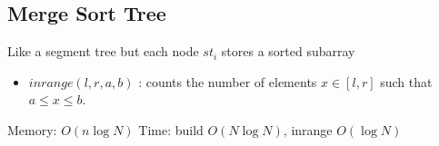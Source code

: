 \subsection{Merge Sort Tree}

Like a segment tree but each node $st_i$ stores a sorted subarray


\begin{itemize}
  \item \textbf{$inrange(l, r, a, b)$} : counts the number of elements $x \in [l, r]$ such that $ a \leq x \leq b$.
\end{itemize}

Memory: $O(n \log{N})$
Time: build $O(N \log{N})$, inrange $O(\log{N})$

